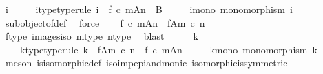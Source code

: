 \begin{isabellebody}
\ i\ \isanewline
\ \ \ \ i{\isacharunderscore}{\kern0pt}type{\isacharbrackleft}{\kern0pt}type{\isacharunderscore}{\kern0pt}rule{\isacharbrackright}{\kern0pt}{\isacharcolon}{\kern0pt}\ {\isachardoublequoteopen}i\ {\isacharcolon}{\kern0pt}\ {\isacharparenleft}{\kern0pt}f\ {\isasymcirc}\isactrlsub c\ m{\isacharparenright}{\kern0pt}{\isasymlparr}A{\isasymrparr}\isactrlbsub n\isactrlesub \ {\isasymrightarrow}\ B{\isachardoublequoteclose}\ \isanewline
\ \ \ \ i{\isacharunderscore}{\kern0pt}mono{\isacharcolon}{\kern0pt}\ {\isachardoublequoteopen}monomorphism\ i{\isachardoublequoteclose}\isanewline
\ \ \ \ \isamarkupfalse%
\ subobject{\isacharunderscore}{\kern0pt}of{\isacharunderscore}{\kern0pt}def\ \isamarkupfalse%
\ force\isanewline
\isanewline
\ \ \isamarkupfalse%
\ {\isachardoublequoteopen}{\isacharparenleft}{\kern0pt}f\ {\isasymcirc}\isactrlsub c\ m{\isacharparenright}{\kern0pt}{\isasymlparr}A{\isasymrparr}\isactrlbsub n\isactrlesub \ {\isasymcong}\ f{\isasymlparr}A{\isasymrparr}\isactrlbsub m\ {\isasymcirc}\isactrlsub c\ n\isactrlesub {\isachardoublequoteclose}\isanewline
\ \ \ \ \isamarkupfalse%
\ f{\isacharunderscore}{\kern0pt}type\ images{\isacharunderscore}{\kern0pt}iso\ m{\isacharunderscore}{\kern0pt}type\ n{\isacharunderscore}{\kern0pt}type\ \isamarkupfalse%
\ blast\isanewline
\ \ \isamarkupfalse%
\ \isamarkupfalse%
\ k\ \isanewline
\ \ \ \ k{\isacharunderscore}{\kern0pt}type{\isacharbrackleft}{\kern0pt}type{\isacharunderscore}{\kern0pt}rule{\isacharbrackright}{\kern0pt}{\isacharcolon}{\kern0pt}\ {\isachardoublequoteopen}k\ {\isacharcolon}{\kern0pt}\ f{\isasymlparr}A{\isasymrparr}\isactrlbsub m\ {\isasymcirc}\isactrlsub c\ n\isactrlesub \ {\isasymrightarrow}\ {\isacharparenleft}{\kern0pt}f\ {\isasymcirc}\isactrlsub c\ m{\isacharparenright}{\kern0pt}{\isasymlparr}A{\isasymrparr}\isactrlbsub n\isactrlesub {\isachardoublequoteclose}\ \isanewline
\ \ \ \ k{\isacharunderscore}{\kern0pt}mono{\isacharcolon}{\kern0pt}\ {\isachardoublequoteopen}monomorphism\ k{\isachardoublequoteclose}\isanewline
\ \ \ \ \isamarkupfalse%
\ {\isacharparenleft}{\kern0pt}meson\ is{\isacharunderscore}{\kern0pt}isomorphic{\isacharunderscore}{\kern0pt}def\ iso{\isacharunderscore}{\kern0pt}imp{\isacharunderscore}{\kern0pt}epi{\isacharunderscore}{\kern0pt}and{\isacharunderscore}{\kern0pt}monic\ isomorphic{\isacharunderscore}{\kern0pt}is{\isacharunderscore}{\kern0pt}symmetric{\isacharparenright}{\kern0pt}\isanewline

\end{isabellebody}
